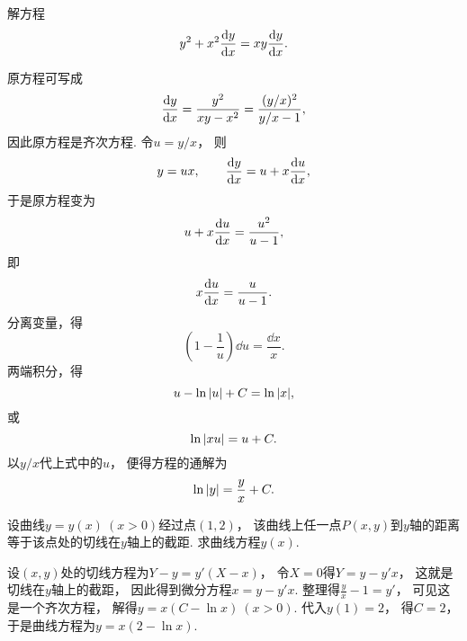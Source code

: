 \begin{example}
解方程\[y^2+x^2 \dv{y}{x} = xy \dv{y}{x}.\]
\begin{solution}
原方程可写成\[
	\dv{y}{x} = \frac{y^2}{xy-x^2} = \frac{(y/x)^2}{y/x-1},
\]
因此原方程是齐次方程.
令\(u=y/x\)，
则\[
	y=ux, \qquad \dv{y}{x} = u + x \dv{u}{x},
\]
于是原方程变为\[
	u+x \dv{u}{x} = \frac{u^2}{u-1},
\]
即\[
	x \dv{u}{x} = \frac{u}{u-1}.
\]
分离变量，得\[
	\left(1-\frac{1}{u}\right) \dd{u} = \frac{\dd{x}}{x}.
\]
两端积分，得\[
	u - \ln\abs{u} + C = \ln\abs{x},
\]或\[
	\ln\abs{xu} = u + C.
\]
以\(y/x\)代上式中的\(u\)，
便得方程的通解为\[
	\ln\abs{y} = \frac{y}{x} + C.
\]
\end{solution}
\end{example}

\begin{example}
设曲线\(y = y(x)\ (x>0)\)经过点\((1,2)\)，
该曲线上任一点\(P(x,y)\)到\(y\)轴的距离等于该点处的切线在\(y\)轴上的截距.
求曲线方程\(y(x)\).
\begin{solution}
设\((x,y)\)处的切线方程为\(Y-y=y'(X-x)\)，
令\(X=0\)得\(Y=y-y'x\)，
这就是切线在\(y\)轴上的截距，
因此得到微分方程\(x = y-y'x\).
整理得\(\frac{y}{x}-1=y'\)，
可见这是一个齐次方程，
解得\(y=x(C-\ln x)\ (x>0)\).
代入\(y(1)=2\)，
得\(C=2\)，
于是曲线方程为\(y=x(2-\ln x)\).
\end{solution}
\end{example}

